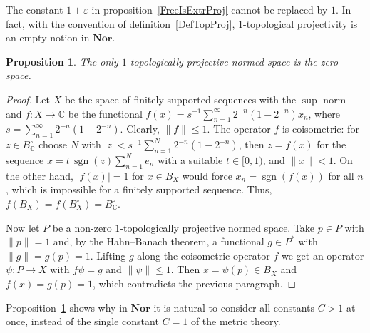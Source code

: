 \documentclass[12pt]{article}
\newtheorem{proposition}[theorem]{Proposition}
\newcommand{\Nor}{\mathbf{Nor}}
\newcommand{\norm}[1]{\lVert #1\rVert}
\begin{document}
The constant $1+\varepsilon$ in proposition~\ref{FreeIsExtrProj} cannot be
replaced by $1$. In fact, with the convention of
definition~\ref{DefTopProj}, $1$-topological projectivity is an empty notion
in $\Nor$.

\begin{proposition}\label{NoOneTopProj} The only $1$-topologically projective
    normed space is the zero space.
\end{proposition}
\begin{proof} Let $X$ be the space of finitely supported sequences with the
    $\sup$-norm and $f:X\to\mathbb{C}$ be the functional
    $f(x)=s^{-1}\sum_{n=1}^\infty 2^{-n}(1-2^{-n})x_n$, where
    $s=\sum_{n=1}^\infty 2^{-n}(1-2^{-n})$. Clearly, $\norm{f}\leq 1$. The
    operator $f$ is coisometric: for $z\in B^\circ_\mathbb{C}$ choose $N$ with
    $|z|<s^{-1}\sum_{n=1}^N 2^{-n}(1-2^{-n})$, then $z=f(x)$ for the sequence
    $x=t\,\operatorname{sgn}(z)\sum_{n=1}^N e_n$ with a suitable $t\in[0,1)$,
    and $\norm{x}<1$. On the other hand, $|f(x)|=1$ for $x\in B_X$ would
    force $x_n=\operatorname{sgn}(f(x))$ for all $n$, which is impossible for
    a finitely supported sequence. Thus, $f(B_X)=f(B_X^\circ)=B^\circ_\mathbb{C}$.

    Now let $P$ be a non-zero $1$-topologically projective normed space. Take
    $p\in P$ with $\norm{p}=1$ and, by the Hahn--Banach theorem, a functional
    $g\in P^*$ with $\norm{g}=g(p)=1$. Lifting $g$ along the coisometric
    operator $f$ we get an operator $\psi:P\to X$ with $f\psi=g$ and
    $\norm{\psi}\leq 1$. Then $x=\psi(p)\in B_X$ and $f(x)=g(p)=1$, which
    contradicts the previous paragraph.
\end{proof}

Proposition~\ref{NoOneTopProj} shows why in $\Nor$ it is natural to consider
all constants $C>1$ at once, instead of the single constant $C=1$ of the
metric theory.
\end{document}
